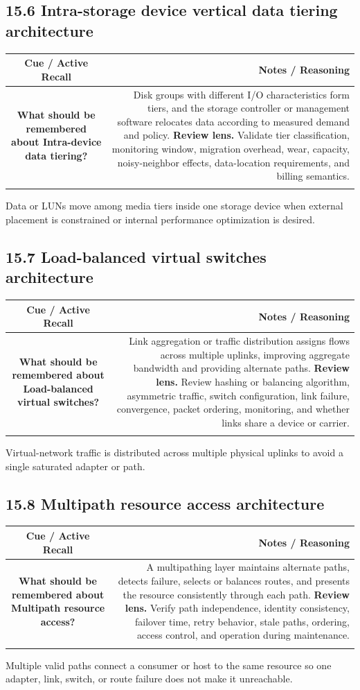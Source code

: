\documentclass[11pt]{article}
\newcommand{\CornellHeader}{\rowcolor{Navy}\color{white}\bfseries Cue / Active Recall & \color{white}\bfseries Notes / Reasoning \\\endhead}
\newcommand{\CornellRow}[2]{\cellcolor{CueGray}\textbf{#1} & #2 \\\addlinespace[3pt]}
\begin{document}
\subsection{15.6 Intra-storage device vertical data tiering architecture}
\begin{longtable}{@{}C N@{}}
\CornellHeader
\CornellRow{What should be remembered about Intra-device data tiering?}{Disk groups with different I/O characteristics form tiers, and the storage controller or management software relocates data according to measured demand and policy. \textbf{Review lens.} Validate tier classification, monitoring window, migration overhead, wear, capacity, noisy-neighbor effects, data-location requirements, and billing semantics.}
\end{longtable}
\begin{sectionsummarybox}
Data or LUNs move among media tiers inside one storage device when external placement is constrained or internal performance optimization is desired.
\end{sectionsummarybox}
\subsection{15.7 Load-balanced virtual switches architecture}
\begin{longtable}{@{}C N@{}}
\CornellHeader
\CornellRow{What should be remembered about Load-balanced virtual switches?}{Link aggregation or traffic distribution assigns flows across multiple uplinks, improving aggregate bandwidth and providing alternate paths. \textbf{Review lens.} Review hashing or balancing algorithm, asymmetric traffic, switch configuration, link failure, convergence, packet ordering, monitoring, and whether links share a device or carrier.}
\end{longtable}
\begin{sectionsummarybox}
Virtual-network traffic is distributed across multiple physical uplinks to avoid a single saturated adapter or path.
\end{sectionsummarybox}
\subsection{15.8 Multipath resource access architecture}
\begin{longtable}{@{}C N@{}}
\CornellHeader
\CornellRow{What should be remembered about Multipath resource access?}{A multipathing layer maintains alternate paths, detects failure, selects or balances routes, and presents the resource consistently through each path. \textbf{Review lens.} Verify path independence, identity consistency, failover time, retry behavior, stale paths, ordering, access control, and operation during maintenance.}
\end{longtable}
\begin{sectionsummarybox}
Multiple valid paths connect a consumer or host to the same resource so one adapter, link, switch, or route failure does not make it unreachable.
\end{sectionsummarybox}
\end{document}
